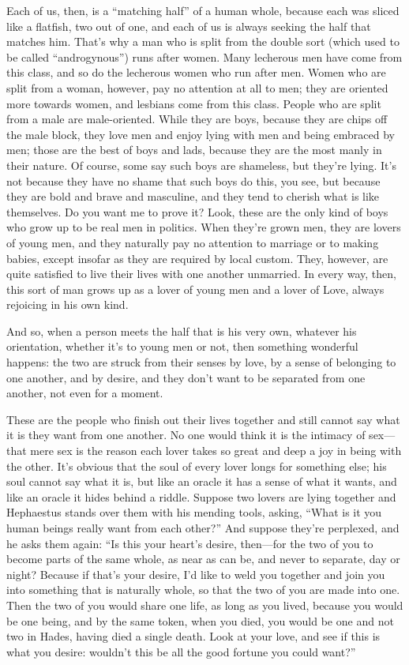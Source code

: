 Each of us, then, is a “matching half” of a human whole, because each
was sliced like a flatfish, two out of one, and each of us is always
seeking the half that matches him. That's why a man who is split from
the double sort (which used to be called “androgynous”) runs after
women. Many  lecherous men have come from this class, and so do
the lecherous women who run after men. Women who are split from a woman,
however, pay no attention at all to men; they are oriented more towards
women, and lesbians come from this class. People who are split from a
male are male-oriented. While they are boys, because they are chips off
the male block, they love men and enjoy lying with men and being
embraced by men;  those are the best of boys and lads,
because they are the most manly in their nature. Of course, some say
such boys are shameless, but they're lying. It's not because they have
no shame that such boys do this, you see, but because they are bold and
brave and masculine, and they tend to cherish what is like themselves.
Do you want me to prove it? Look, these are the only kind of boys who
grow up to be real men in politics. When  they're grown men, they
are lovers of young men, and they naturally pay no attention to marriage
or to making babies, except insofar as they are required by local
custom. They, however, are quite satisfied to live their lives with one
another unmarried. In every way, then, this sort of man grows up as a
lover of young men and a lover of Love, always rejoicing in his own
kind.

And so, when a person meets the half that is his very own, whatever his
orientation, whether it's to young men or not, then something wonderful
happens: the two are struck from their senses by love, by a sense of
 belonging to one another, and by desire, and they don't want to
be separated from one another, not even for a moment.

These are the people who finish out their lives together and still
cannot say what it is they want from one another. No one would think it
is the intimacy of sex---that mere sex is the reason each lover takes so
great and deep a joy in being with the other. It's obvious that the soul
of every lover  longs for something else; his soul cannot say
what it is, but like an oracle it has a sense of what it wants, and like
an oracle it hides behind a riddle. Suppose two lovers are lying
together and
Hephaestus stands
over them with his mending tools, asking, “What is it you human beings
really want from each other?” And suppose they're perplexed, and he asks
them again: “Is this your heart's desire, then---for the two of you to
become parts of the same whole, as near as can be, and never to
separate, day or night? Because if that's your desire, I'd like to weld
you together and join you into something that is naturally whole, so
that the two of you are made  into one. Then the two of you would
share one life, as long as you lived, because you would be one being,
and by the same token, when you died, you would be one and not two in
Hades, having died a single death. Look at your love, and see if this is
what you desire: wouldn't this be all the good fortune you could want?”


